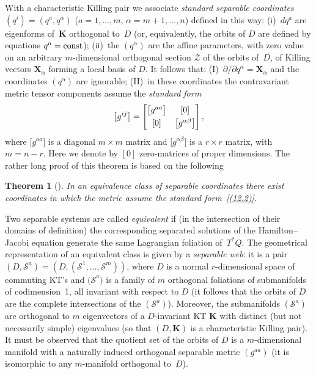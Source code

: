 \documentclass[10pt,a4paper]{amsart}
\def\bs{\boldsymbol}
\numberwithin{equation}{section}
\newtheorem{Theorem}{Theorem}[section]
 { \theoremstyle{definition}
\newtheorem{Notation}[Theorem]{Notation}
\newtheorem{Example}[Theorem]{Example}
\newtheorem{Remark}[Theorem]{Remark}
\newtheorem{Remarks}[Theorem]{Remarks}
 }
\providecommand{\cal}{\mathcal}
\begin{document}
With a characteristic Killing pair we associate {\it standard separable coordinates} $(q^i)=(q^a,q^\alpha)$
($a=1,\ldots,m$, $\alpha=m+1,\ldots, n$) def\/ined in this way:
(i)~$dq^a$ are eigenforms of~$\bs K$ orthogonal to~$D$ (or, equivalently, the orbits of $D$ are def\/ined by equations $q^a={\rm const}$); (ii)~the $(q^\alpha)$ are the af\/f\/ine parameters, with zero value on an arbitrary $m$-dimensional orthogonal section $\cal Z$  of the orbits of~$D$, of Killing vectors $\bs X_\alpha$ forming a local basis of $D$. It follows that: (I)~$\partial/\partial q^\alpha=\bs X_\alpha$ and the coordinates $(q^\alpha)$ are ignorable;
(II)~in these coordinates the contravariant metric tensor components assume the {\it standard form}
\begin{gather}
\big[g^{ij}\big]=
\bmatrix \big[g^{aa}\big] & [0]
\\[3pt]
 [0] & \big[g^{\alpha\beta}\big] \cr \endbmatrix,
\label{(12.2)}
\end{gather}
where $\big[g^{aa}\big]$ is a diagonal $m\times m$ matrix and $\big[ g^{\alpha\beta}\big]$ is a $r\times r$ matrix, with $m=n-r$. Here we denote by $[0]$ zero-matrices of proper dimensions. The rather long proof of this theorem is based on the following

\begin{Theorem}[\cite{Benenti-1980}]\label{t:12.2}
In an equivalence class of separable coordinates there exist coordinates in which the metric assume the standard form~\eqref{(12.2)}.
\end{Theorem}

Two separable systems are called {\it equivalent} if (in the intersection of their domains of def\/i\-ni\-tion) the corresponding separated solutions of the Hamilton--Jacobi equation generate the same Lagrangian foliation of~$T^*Q$.
The geometrical representation of an equivalent class is given by
a {\it separable web}: it is a pair $(D,{\cal S}^a)=(D, ({\cal S}^1,\ldots,{\cal S}^m))$, where $D$ is a normal $r$-dimensional space of commuting  KT's and ${(\cal S}^a)$ is a family of $m$ orthogonal foliations
of submanifolds of codimension~1, all invariant with respect to  $D$ (it follows that the orbits of $D$ are the complete intersections of the $({\cal S}^a)$). Moreover, the submanifolds $({\cal S}^a)$ are orthogonal to $m$ eigenvectors of a $D$-invariant KT $\bs K$ with distinct (but not necessarily simple) eigenvalues (so that $(D,\bs K)$ is a characteristic Killing pair).
It must be observed that the quotient set of the orbits of $D$ is a $m$-dimensional manifold with a naturally induced orthogonal separable metric $(g^{aa})$ (it is isomorphic to any $m$-manifold orthogonal to~$D$).
\end{document}
